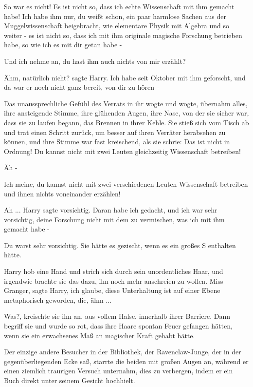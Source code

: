 \glqq{}So war es nicht! Es ist nicht so, dass ich echte Wissenschaft mit ihm
gemacht habe! Ich habe ihm nur, du weißt schon, ein paar harmlose Sachen aus der
Muggelwissenschaft beigebracht, wie elementare Physik mit Algebra und so weiter
- es ist nicht so, dass ich mit ihm originale magische Forschung betrieben habe,
so wie ich es mit dir getan habe -\grqq{}

\glqq{}Und ich nehme an, du hast ihm auch nichts von mir erzählt?\grqq{}

\glqq{}Ähm, natürlich nicht?\grqq{} sagte Harry. \glqq{}Ich habe seit Oktober mit
ihm geforscht, und da war er noch nicht ganz bereit, von dir zu hören -\grqq{}

Das unaussprechliche Gefühl des Verrats in ihr wogte und wogte, übernahm alles,
ihre ansteigende Stimme, ihre glühenden Augen, ihre Nase, von der sie sicher
war, dass sie zu laufen begann, das Brennen in ihrer Kehle. Sie stieß sich vom
Tisch ab und trat einen Schritt zurück, um besser auf ihren Verräter herabsehen
zu können, und ihre Stimme war fast kreischend, als sie schrie: \glqq{}Das ist
nicht in Ordnung! Du kannst nicht mit zwei Leuten gleichzeitig Wissenschaft
betreiben!\grqq{}

\glqq{}Äh -\grqq{}

\glqq{}Ich meine, du kannst nicht mit zwei verschiedenen Leuten Wissenschaft
betreiben und ihnen nichts voneinander erzählen!\grqq{}

\glqq{}Ah ...\grqq{} Harry sagte vorsichtig. \glqq{}Daran habe ich gedacht, und
ich war sehr vorsichtig, deine Forschung nicht mit dem zu vermischen, was ich
mit ihm gemacht habe -\grqq{}

\glqq{}Du warst sehr vorsichtig.\grqq{} Sie hätte es gezischt, wenn es ein großes
\glqq{}S\grqq{} enthalten hätte.

Harry hob eine Hand und strich sich durch sein unordentliches Haar, und
irgendwie brachte sie das dazu, ihn noch mehr anschreien zu wollen. \glqq{}Miss
Granger\grqq{}, sagte Harry, \glqq{}ich glaube, diese Unterhaltung ist auf einer
Ebene metaphorisch geworden, die, ähm ...\grqq{}

\glqq{}Was?\grqq{}, kreischte sie ihn an, aus vollem Halse, innerhalb ihrer
Barriere. Dann begriff sie und wurde so rot, dass ihre Haare spontan Feuer
gefangen hätten, wenn sie ein erwachsenes Maß an magischer Kraft gehabt hätte.

Der einzige andere Besucher in der Bibliothek, der Ravenclaw-Junge, der in der
gegenüberliegenden Ecke saß, starrte die beiden mit großen Augen an, während er
einen ziemlich traurigen Versuch unternahm, dies zu verbergen, indem er ein Buch
direkt unter seinem Gesicht hochhielt.

